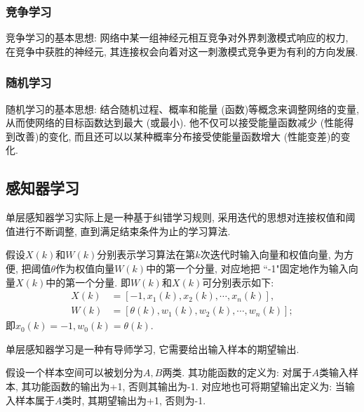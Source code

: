 \subsubsection{竞争学习}
竞争学习的基本思想: 网络中某一组神经元相互竞争对外界刺激模式响应的权力, 在竞争中获胜的神经元, 其连接权会向着对这一刺激模式竞争更为有利的方向发展.
\subsubsection{随机学习}
随机学习的基本思想: 结合随机过程、概率和能量 (函数)等概念来调整网络的变量, 从而使网络的目标函数达到最大 (或最小). 他不仅可以接受能量函数减少 (性能得到改善)的变化, 而且还可以以某种概率分布接受使能量函数增大 (性能变差)的变化.
\subsection{感知器学习}
单层感知器学习实际上是一种基于纠错学习规则, 采用迭代的思想对连接权值和阈值进行不断调整, 直到满足结束条件为止的学习算法.

假设$X (k)$和$W(k)$分别表示学习算法在第$k$次迭代时输入向量和权值向量, 为方便, 把阈值$\theta$作为权值向量$W (k)$中的第一个分量, 对应地把 ``-1"固定地作为输入向量$X (k)$中的第一个分量. 即$W (k)$和$X (k)$可分别表示如下:
\begin{align}
    X (k)&=[-1, x_1 (k), x_2 (k),\cdots, x_n (k)],\\
    W (k)&=[\theta (k),w_1 (k), w_2 (k),\cdots,w_n (k)];
\end{align}
即$x_0 (k)=-1, w_0 (k)=\theta (k)$.

\begin{remark}
    单层感知器学习是一种有导师学习, 它需要给出输入样本的期望输出.
\end{remark}

假设一个样本空间可以被划分为$A, B$两类. 其功能函数的定义为: 对属于$A$类输入样本, 其功能函数的输出为+1, 否则其输出为-1.
对应地也可将期望输出定义为: 当输入样本属于$A$类时, 其期望输出为+1, 否则为-1.

